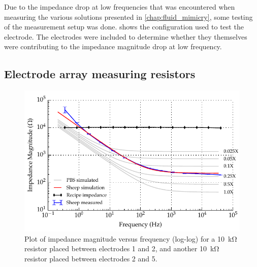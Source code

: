 Due to the impedance drop at low frequencies that was encountered when measuring the various solutions presented in \cref{chap:fluid_mimicry}, some testing of the measurement setup was done.
 shows the configuration used to test the electrode.
The electrodes were included to determine whether they themselves were contributing to the impedance magnitude drop at low frequency.


\subsection{Electrode array measuring resistors}

\begin{figure}
    \centering
    \includegraphics{content/appendices/Solution-Impedance-Measurements/graphics/run14_calibration_10k_noWater_ZVsF_graph_mag}
    \caption{\label{fig:calibration_10kRes_mag}Plot of impedance magnitude versus frequency (log-log) for a \SI{10}{\kilo\ohm} resistor placed between electrodes 1 and 2, and another \SI{10}{\kilo\ohm} resistor placed between electrodes 2 and 5.}
\end{figure}

